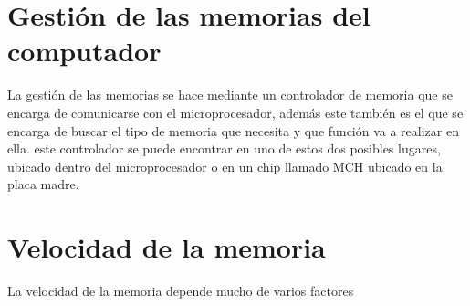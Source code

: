 \documentclass{article}
\begin{document}
	\section{Gestión de las memorias del computador}
	La gestión de las memorias se hace mediante un controlador de memoria que se encarga de comunicarse con el microprocesador, además este también es el que se encarga de buscar el tipo de memoria que necesita y que función va a realizar en ella.
	este controlador se puede encontrar en uno de estos dos posibles lugares, ubicado dentro del microprocesador o en un chip llamado MCH ubicado en la placa madre.\cite{memoria}
	
	\section{Velocidad de la memoria}
	La velocidad de la memoria depende mucho de varios factores
	
	
	
	
	
\end{document}
